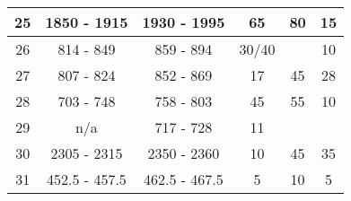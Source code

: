\begin{table}[]
\begin{tabular}{|c|c|c|c|c|c|}
25                                                          & 1850 - 1915                                            & 1930 - 1995                                              & 65                                                                   & 80                                                               & 15                                                          \\ \hline
26                                                          & 814 - 849                                              & 859 - 894                                                & 30/40                                                                &                                                                  & 10                                                          \\ \hline
27                                                          & 807 - 824                                              & 852 - 869                                                & 17                                                                   & 45                                                               & 28                                                          \\ \hline
28                                                          & 703 - 748                                              & 758 - 803                                                & 45                                                                   & 55                                                               & 10                                                          \\ \hline
29                                                          & n/a                                                    & 717 - 728                                                & 11                                                                   &                                                                  &                                                             \\ \hline
30                                                          & 2305 - 2315                                            & 2350 - 2360                                              & 10                                                                   & 45                                                               & 35                                                          \\ \hline
31                                                          & 452.5 - 457.5                                          & 462.5 - 467.5                                            & 5                                                                    & 10                                                               & 5                                                           \\ \hline
\end{tabular}
\end{table}

